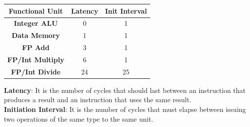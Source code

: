 \documentclass[12pt]{article}
\begin{document}
\begin{center}
  \begin{tabular}{ |c||c|c| }
    \hline
    \textbf{Functional Unit} & Latency & Init Interval\\
    \hline
    \textbf{Integer ALU} & 0 & 1\\
    \hline
    \textbf{Data Memory} & 1 & 1\\
    \hline
    \textbf{FP Add} & 3 & 1\\
    \hline
    \textbf{FP/Int Multiply} & 6 & 1\\
    \hline
    \textbf{FP/Int Divide} & 24 & 25\\
    \hline
  \end{tabular}
\end{center}
\textbf{Latency}: It is the number of cycles that should last between an instruction that produces a result and an instruction that uses the same result.\\
\textbf{Initiation Interval}: It is the number of cycles that must elapse between issuing two operations of the same type to the same unit.\\
\end{document}
